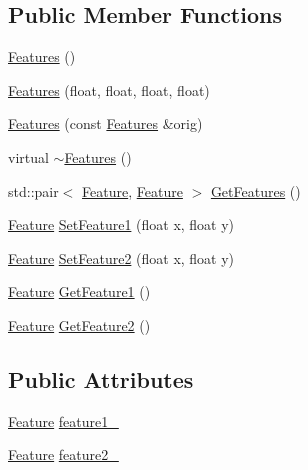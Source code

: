 \subsection*{Public Member Functions}
\begin{DoxyCompactItemize}
\item 
\hyperlink{classrdf_1_1bpc_1_1Features_abfca82d68cea9e637d0b601395d6da6f}{Features} ()
\item 
\hyperlink{classrdf_1_1bpc_1_1Features_a47d8976ae88c7c3dc1445d1437eba66c}{Features} (float, float, float, float)
\item 
\hyperlink{classrdf_1_1bpc_1_1Features_a9055f349ed663508478dbe1e92dcdceb}{Features} (const \hyperlink{classrdf_1_1bpc_1_1Features}{Features} \&orig)
\item 
virtual \hyperlink{classrdf_1_1bpc_1_1Features_a24752e0df868197b2225abc369a374e7}{$\sim$\+Features} ()
\item 
std\+::pair$<$ \hyperlink{namespacerdf_1_1bpc_a507d4ac6b23164245625d13196e564bc}{Feature}, \hyperlink{namespacerdf_1_1bpc_a507d4ac6b23164245625d13196e564bc}{Feature} $>$ \hyperlink{classrdf_1_1bpc_1_1Features_aadc3584d493974a48a3ec633eb49bbda}{Get\+Features} ()
\item 
\hyperlink{namespacerdf_1_1bpc_a507d4ac6b23164245625d13196e564bc}{Feature} \hyperlink{classrdf_1_1bpc_1_1Features_add4c2edfb1f05b59662e9f2ebafafdd2}{Set\+Feature1} (float x, float y)
\item 
\hyperlink{namespacerdf_1_1bpc_a507d4ac6b23164245625d13196e564bc}{Feature} \hyperlink{classrdf_1_1bpc_1_1Features_a0091e0dd9ba651e146a12562e8ecaa0e}{Set\+Feature2} (float x, float y)
\item 
\hyperlink{namespacerdf_1_1bpc_a507d4ac6b23164245625d13196e564bc}{Feature} \hyperlink{classrdf_1_1bpc_1_1Features_a2e893eccf388415169cd08b45d9d1964}{Get\+Feature1} ()
\item 
\hyperlink{namespacerdf_1_1bpc_a507d4ac6b23164245625d13196e564bc}{Feature} \hyperlink{classrdf_1_1bpc_1_1Features_a4a9aae0520825d9f9bee370449632522}{Get\+Feature2} ()
\end{DoxyCompactItemize}
\subsection*{Public Attributes}
\begin{DoxyCompactItemize}
\item 
\hyperlink{namespacerdf_1_1bpc_a507d4ac6b23164245625d13196e564bc}{Feature} \hyperlink{classrdf_1_1bpc_1_1Features_a01f4d6cb79311da3b39f82882112bbcb}{feature1\+\_\+}
\item 
\hyperlink{namespacerdf_1_1bpc_a507d4ac6b23164245625d13196e564bc}{Feature} \hyperlink{classrdf_1_1bpc_1_1Features_a563e43877615b6967a5ec9049bab4b65}{feature2\+\_\+}
\end{DoxyCompactItemize}
